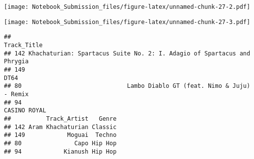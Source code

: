 \documentclass[
]{article}
\newenvironment{Shaded}{\begin{snugshade}}{\end{snugshade}}
\newcommand{\CommentTok}[1]{\textcolor[rgb]{0.56,0.35,0.01}{\textit{#1}}}
\newcommand{\DataTypeTok}[1]{\textcolor[rgb]{0.13,0.29,0.53}{#1}}
\newcommand{\DecValTok}[1]{\textcolor[rgb]{0.00,0.00,0.81}{#1}}
\newcommand{\KeywordTok}[1]{\textcolor[rgb]{0.13,0.29,0.53}{\textbf{#1}}}
\newcommand{\NormalTok}[1]{#1}
\newcommand{\OperatorTok}[1]{\textcolor[rgb]{0.81,0.36,0.00}{\textbf{#1}}}
\newcommand{\OtherTok}[1]{\textcolor[rgb]{0.56,0.35,0.01}{#1}}
\newcommand{\StringTok}[1]{\textcolor[rgb]{0.31,0.60,0.02}{#1}}
\begin{document}
\texttt{[image: Notebook\_Submission\_files/figure-latex/unnamed-chunk-27-2.pdf]}

\begin{Shaded}
\end{Shaded}

\texttt{[image: Notebook\_Submission\_files/figure-latex/unnamed-chunk-27-3.pdf]}

\begin{Shaded}
\end{Shaded}

\begin{verbatim}
##                                                                 Track_Title
## 142 Khachaturian: Spartacus Suite No. 2: I. Adagio of Spartacus and Phrygia
## 149                                                                    DT64
## 80                              Lambo Diablo GT (feat. Nimo & Juju) - Remix
## 94                                                             CASINO ROYAL
##          Track_Artist   Genre
## 142 Aram Khachaturian Classic
## 149            Moguai  Techno
## 80               Capo Hip Hop
## 94            Kianush Hip Hop
\end{verbatim}

\begin{Shaded}
\end{Shaded}
\end{document}
